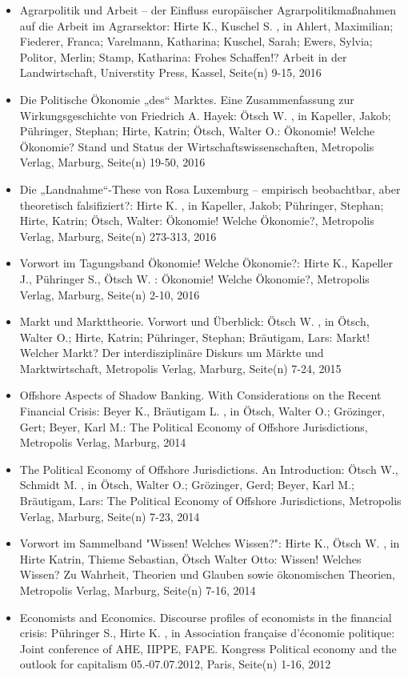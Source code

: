 \begin{itemize}
\item Agrarpolitik und Arbeit – der Einfluss europäischer Agrarpolitikmaßnahmen auf die Arbeit im Agrarsektor: Hirte K., Kuschel S. , in Ahlert, Maximilian; Fiederer, Franca; Varelmann, Katharina; Kuschel, Sarah; Ewers, Sylvia; Politor, Merlin; Stamp, Katharina: Frohes Schaffen!? Arbeit in der Landwirtschaft, Universtity Press, Kassel, Seite(n) 9-15, 2016
\item Die Politische Ökonomie „des“ Marktes. Eine Zusammenfassung zur Wirkungsgeschichte von Friedrich A. Hayek: Ötsch W. , in Kapeller, Jakob; Pühringer, Stephan; Hirte, Katrin; Ötsch, Walter O.: Ökonomie! Welche Ökonomie? Stand und Status der Wirtschaftswissenschaften, Metropolis Verlag, Marburg, Seite(n) 19-50, 2016
\item Die „Landnahme“-These von Rosa Luxemburg – empirisch beobachtbar, aber theoretisch falsifiziert?: Hirte K. , in Kapeller, Jakob; Pühringer, Stephan; Hirte, Katrin; Ötsch, Walter: Ökonomie! Welche Ökonomie?, Metropolis Verlag, Marburg, Seite(n) 273-313, 2016
\item Vorwort im Tagungsband Ökonomie! Welche Ökonomie?: Hirte K., Kapeller J., Pühringer S., Ötsch W. : Ökonomie! Welche Ökonomie?, Metropolis Verlag, Marburg, Seite(n) 2-10, 2016
\item Markt und Markttheorie. Vorwort und Überblick: Ötsch W. , in Ötsch, Walter O.; Hirte, Katrin; Pühringer, Stephan; Bräutigam, Lars: Markt! Welcher Markt? Der interdisziplinäre Diskurs um Märkte und Marktwirtschaft, Metropolis Verlag, Marburg, Seite(n) 7-24, 2015
\item Offshore Aspects of Shadow Banking. With Considerations on the Recent Financial Crisis: Beyer K., Bräutigam L. , in Ötsch, Walter O.; Grözinger, Gert; Beyer, Karl M.: The Political Economy of Offshore Jurisdictions, Metropolis Verlag, Marburg, 2014
\item The Political Economy of Offshore Jurisdictions. An Introduction: Ötsch W., Schmidt M. , in Ötsch, Walter O.; Grözinger, Gerd; Beyer, Karl M.; Bräutigam, Lars: The Political Economy of Offshore Jurisdictions, Metropolis Verlag, Marburg, Seite(n) 7-23, 2014
\item Vorwort im Sammelband "Wissen! Welches Wissen?": Hirte K., Ötsch W. , in Hirte Katrin, Thieme Sebastian, Ötsch Walter Otto: Wissen! Welches Wissen? Zu Wahrheit, Theorien und Glauben sowie ökonomischen Theorien, Metropolis Verlag, Marburg, Seite(n) 7-16, 2014
\item Economists and Economics. Discourse profiles of economists in the financial crisis: Pühringer S., Hirte K. , in Association française d'économie politique: Joint conference of AHE, IIPPE, FAPE. Kongress Political economy and the outlook for capitalism 05.-07.07.2012, Paris, Seite(n) 1-16, 2012

\end{itemize}
